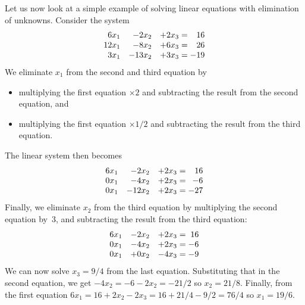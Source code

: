 Let us now look at a simple example of solving linear equations
with elimination of unknowns. Consider the system
\begin{equation}
  \begin{array}{rrr@{{}={}}r}
    6x_1&-2x_2&+2x_3&16 \\ 12x_1&-8x_2&+6x_3&26 \\ 3x_1&-13x_2&+3x_3&-19
  \end{array}
  \label{eq:elimination-example}
\end{equation}
We eliminate $x_1$ from the second and third equation by
\begin{itemize}
\item multiplying the first equation $\times 2$ and subtracting the
  result from the second equation, and
\item multiplying the first equation $\times 1/2$ and subtracting the
  result from the third equation.
\end{itemize}
The linear system then becomes
\[
  \begin{array}{rrr@{{}={}}r}
      6x_1&-2x_2&+2x_3&16\\ 0x_1&-4x_2&+2x_3&-6\\ 0x_1&-12x_2&+2x_3&-27
  \end{array}
\]
Finally, we eliminate $x_2$ from the third equation by multiplying
the second equation by~3, and subtracting the result from the third equation:
\[
  \begin{array}{rrr@{{}={}}r}
  6x_1&-2x_2&+2x_3&16\\ 0x_1&-4x_2&+2x_3&-6\\ 0x_1&+0x_2&-4x_3&-9
\end{array}
\]
We can now solve $x_3=9/4$ from the last equation. Substituting that
in the second equation, we get $-4x_2=-6-2x_2=-21/2$ so
$x_2=21/8$. Finally, from the first equation $6x_1=16+2x_2-2x_3=
16+21/4-9/2=76/4$ so $x_1=19/6$.

